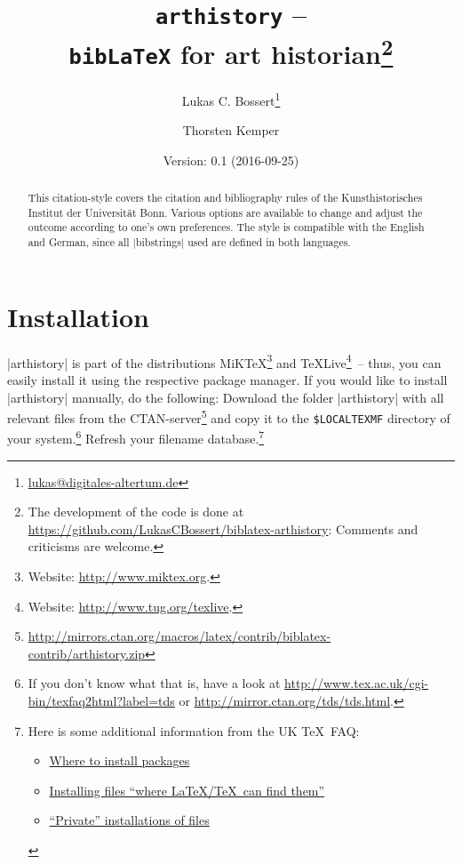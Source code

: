 \documentclass[a4paper,
10pt,
ngerman,
english
]{ltxdoc}
\def\thisarthistoryversion{0.1}
\def\thisarthistorydate{2016-09-25}
\begin{document}
\title{\texttt{arthistory} -- \\\texttt{bib\LaTeX} for art historian\footnote{The development of the code is done at \url{https://github.com/LukasCBossert/biblatex-arthistory}: 
Comments and criticisms are welcome.
}}
\author{Lukas C. Bossert\thanks{\href{mailto:lukas@digitales-altertum.de}{lukas@digitales-altertum.de}} \and Thorsten Kemper}
\date{Version: \thisarthistoryversion{} (\thisarthistorydate)} 
 \maketitle
 \begin{abstract}
\noindent This citation-style covers the citation and bibliography rules of the Kunsthistorisches Institut der Universität Bonn.
Various options are available to change and adjust the outcome according to one's own preferences. 
The style is compatible with the English and German, since all |bibstrings| used are defined in both languages.

 \end{abstract}


\begin{multicols}{2}
\footnotesize\parskip=0mm \tableofcontents
\end{multicols}

\section{Installation}
|arthistory| is part of the distributions MiK\TeX \footnote{Website: \url{http://www.miktex.org}.} 
and \TeX Live\footnote{Website: \url{http://www.tug.org/texlive}.}~-- thus, you
can easily install it using the respective package manager. 
If you would like to
install |arthistory| manually, do the following:
Download the folder |arthistory| with all relevant files from the CTAN-server\footnote{\url{http://mirrors.ctan.org/macros/latex/contrib/biblatex-contrib/arthistory.zip}} and copy it to the \texttt{\$LOCALTEXMF} directory of
 your system.\footnote{If you don't know what that is, have a look at
\url{http://www.tex.ac.uk/cgi-bin/texfaq2html?label=tds} or 
\url{http://mirror.ctan.org/tds/tds.html}.} 
Refresh your filename database.\footnote{ 
Here is some additional information from the UK \TeX\ FAQ:
\begin{itemize}[nosep,after=\vspace{-\baselineskip} ]
  \item \href{%
    http://www.tex.ac.uk/cgi-bin/texfaq2html?label=install-where}{%
    Where to install packages}
  \item \href{%
    http://www.tex.ac.uk/cgi-bin/texfaq2html?label=inst-wlcf}{%
    Installing files \enquote{where \LaTeX /TeX\ can find them}}
  \item \href{%
    http://www.tex.ac.uk/cgi-bin/texfaq2html?label=privinst}{%
    \enquote{Private} installations of files}
\end{itemize}
}
\end{document}
